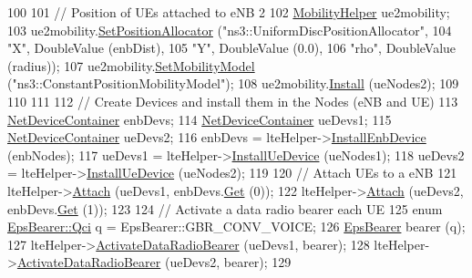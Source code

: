 \begin{DoxyCode}
100 
101   \textcolor{comment}{// Position of UEs attached to eNB 2}
102   \hyperlink{classns3_1_1MobilityHelper}{MobilityHelper} ue2mobility;
103   ue2mobility.\hyperlink{classns3_1_1MobilityHelper_ac59d5295076be3cc11021566713a28c5}{SetPositionAllocator} (\textcolor{stringliteral}{"ns3::UniformDiscPositionAllocator"},
104                                     \textcolor{stringliteral}{"X"}, DoubleValue (enbDist),
105                                     \textcolor{stringliteral}{"Y"}, DoubleValue (0.0),
106                                     \textcolor{stringliteral}{"rho"}, DoubleValue (radius));
107   ue2mobility.\hyperlink{classns3_1_1MobilityHelper_a030275011b6f40682e70534d30280aba}{SetMobilityModel} (\textcolor{stringliteral}{"ns3::ConstantPositionMobilityModel"});
108   ue2mobility.\hyperlink{classns3_1_1MobilityHelper_a07737960ee95c0777109cf2994dd97ae}{Install} (ueNodes2);
109 
110 
111 
112   \textcolor{comment}{// Create Devices and install them in the Nodes (eNB and UE)}
113   \hyperlink{classns3_1_1NetDeviceContainer}{NetDeviceContainer} enbDevs;
114   \hyperlink{classns3_1_1NetDeviceContainer}{NetDeviceContainer} ueDevs1;
115   \hyperlink{classns3_1_1NetDeviceContainer}{NetDeviceContainer} ueDevs2;
116   enbDevs = lteHelper->\hyperlink{classns3_1_1LteHelper_a5e009ad35ef85f46b5a6099263f15a03}{InstallEnbDevice} (enbNodes);
117   ueDevs1 = lteHelper->\hyperlink{classns3_1_1LteHelper_ac9cd932d7de92811cfa953c2e3b2fc9f}{InstallUeDevice} (ueNodes1);
118   ueDevs2 = lteHelper->\hyperlink{classns3_1_1LteHelper_ac9cd932d7de92811cfa953c2e3b2fc9f}{InstallUeDevice} (ueNodes2);
119 
120   \textcolor{comment}{// Attach UEs to a eNB}
121   lteHelper->\hyperlink{classns3_1_1LteHelper_a9466743f826aa2652a87907b7f0a1c87}{Attach} (ueDevs1, enbDevs.\hyperlink{classns3_1_1NetDeviceContainer_a677d62594b5c9d2dea155cc5045f4d0b}{Get} (0));
122   lteHelper->\hyperlink{classns3_1_1LteHelper_a9466743f826aa2652a87907b7f0a1c87}{Attach} (ueDevs2, enbDevs.\hyperlink{classns3_1_1NetDeviceContainer_a677d62594b5c9d2dea155cc5045f4d0b}{Get} (1));
123 
124   \textcolor{comment}{// Activate a data radio bearer each UE}
125   \textcolor{keyword}{enum} \hyperlink{structns3_1_1EpsBearer_aecf0c67109c5eb4ec0b07226fff5885e}{EpsBearer::Qci} q = EpsBearer::GBR\_CONV\_VOICE;
126   \hyperlink{structns3_1_1EpsBearer}{EpsBearer} bearer (q);
127   lteHelper->\hyperlink{classns3_1_1LteHelper_ac896e16cf162e4beeaa292d39ab1b700}{ActivateDataRadioBearer} (ueDevs1, bearer);
128   lteHelper->\hyperlink{classns3_1_1LteHelper_ac896e16cf162e4beeaa292d39ab1b700}{ActivateDataRadioBearer} (ueDevs2, bearer);
129 

\end{DoxyCode}
